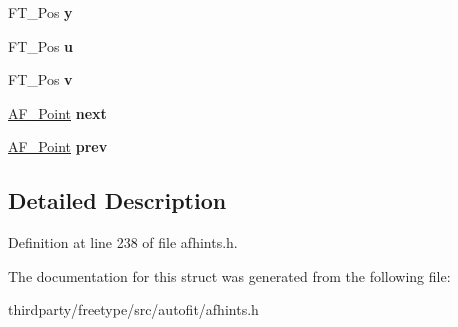 \begin{DoxyCompactItemize}
F\+T\+\_\+\+Pos {\bfseries y}
\item 
\mbox{\label{struct_a_f___point_rec___ab8c914d28cdef55277140a9c7ff71d2f}} 
F\+T\+\_\+\+Pos {\bfseries u}
\item 
\mbox{\label{struct_a_f___point_rec___abf2ec1063b836a0af242de9ec6b5f892}} 
F\+T\+\_\+\+Pos {\bfseries v}
\item 
\mbox{\label{struct_a_f___point_rec___a645170dd7325b98848313447aeee08fa}} 
\hyperlink{struct_a_f___point_rec__}{A\+F\+\_\+\+Point} {\bfseries next}
\item 
\mbox{\label{struct_a_f___point_rec___a581efa318132490ba5d4f491f71ba3e2}} 
\hyperlink{struct_a_f___point_rec__}{A\+F\+\_\+\+Point} {\bfseries prev}
\end{DoxyCompactItemize}


\subsection{Detailed Description}


Definition at line 238 of file afhints.\+h.



The documentation for this struct was generated from the following file\+:\begin{DoxyCompactItemize}
\item 
thirdparty/freetype/src/autofit/afhints.\+h\end{DoxyCompactItemize}

